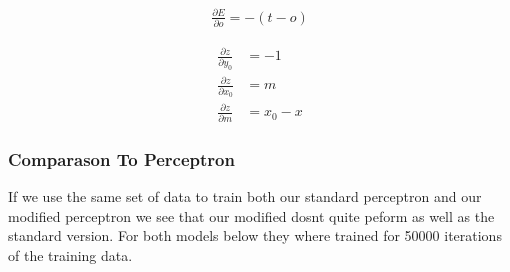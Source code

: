 \documentclass{article}
\begin{document}
\begin{align}
\frac{\partial E}{\partial o} = -(t - o)
\end{align}

\begin{align}
\frac{\partial z}{\partial y_0} &= -1\\
\frac{\partial z}{\partial x_0} &= m\\
\frac{\partial z}{\partial m} &= x_0 - x
\end{align}

\subsubsection{Comparason To Perceptron}
If we use the same set of data to train both our standard perceptron and our modified perceptron we see that our modified dosnt quite peform as well as the standard version. For both models below they where trained for 50000 iterations of the training data.
\end{document}
